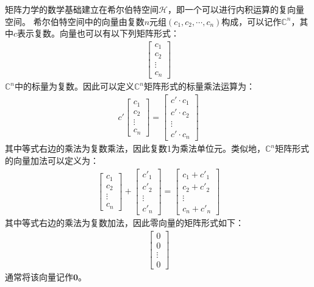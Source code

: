 矩阵力学的数学基础建立在希尔伯特空间\(\mathcal{H}\)，即一个可以进行内积运算的复向量空间。
希尔伯特空间中的向量由复数\(n\)元组\(\left(c_1,c_2,\cdots,c_n\right)\)构成，可以记作\(\mathbb{C}^n\)，其中\(c\)表示复数。向量也可以有以下列矩阵形式：
\begin{align}
    \left[\begin{matrix}
        c_1\\c_2\\\vdots\\c_n
    \end{matrix}\right]
\end{align}
\(\mathbb{C}^n\)中的标量为复数。因此可以定义\(\mathbb{C}^n\)矩阵形式的标量乘法运算为：
\begin{align}
    c'\left[\begin{matrix}
        c_1\\c_2\\\vdots\\c_n
    \end{matrix}\right]=\left[\begin{matrix}
        c'\cdot c_1\\c'\cdot c_2\\\vdots\\c'\cdot c_n
    \end{matrix}\right]
\end{align}
其中等式右边的乘法为复数乘法，因此复数1为乘法单位元。类似地，\(\mathbb{C}^n\)矩阵形式的向量加法可以定义为：
\begin{align}
    \left[\begin{matrix}
        c_1\\c_2\\\vdots\\c_n
    \end{matrix}\right]
    +\left[\begin{matrix}
        c'_1\\c'_2\\\vdots\\c'_n
    \end{matrix}\right]=\left[\begin{matrix}
        c_1+c'_1\\c_2+c'_2\\\vdots\\c_n+c'_n
    \end{matrix}\right]
\end{align}
其中等式右边的乘法为复数加法，因此零向量的矩阵形式如下：
\begin{align}
    \left[\begin{matrix}
        0\\0\\\vdots\\0
    \end{matrix}\right]
\end{align}
通常将该向量记作\(\mathbf{0}\)。


